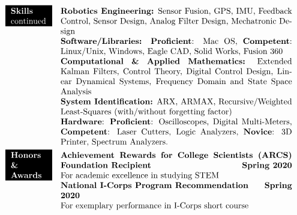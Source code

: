 \documentclass[paper=a4,fontsize=11pt]{article} %
\def \mainColWidth {0.8\textwidth}		%
\def \leftColWidth {0.125\textwidth}		%
\begin{document}
\begin{align*}
{%
	}%
\\
	\colorbox{black}{\color{white}{
			\parbox[t]{\leftColWidth}{%
				\textbf{Skills} continued}
		}%
	}
	& & 
	\parbox[t]{\mainColWidth}{%
		\textbf{Robotics Engineering:} Sensor Fusion, GPS, IMU, Feedback Control, Sensor Design, Analog Filter Design, Mechatronic Design\\
		\textbf{Software/Libraries:} \textbf{Proficient}: Mac OS, \textbf{Competent}: Linux/Unix, Windows, Eagle CAD, Solid Works, Fusion 360\\
		\textbf{Computational \& Applied Mathematics:} Extended Kalman Filters, Control Theory, Digital Control Design, Linear Dynamical Systems, Frequency Domain and State Space Analysis\\
		\textbf{System Identification:} ARX, ARMAX, Recursive/Weighted Least-Squares (with/without forgetting factor)\\
		\textbf{Hardware}: \textbf{Proficient}: Oscilloscopes, Digital Multi-Meters, \textbf{Competent}: Laser Cutters, Logic Analyzers, \textbf{Novice}: 3D Printer, Spectrum Analyzers.
}%
\\
\colorbox{black}{\color{white}{
		\parbox[t]{\leftColWidth}{%
			\textbf{Honors \& Awards}}
	}%
}
& &
\parbox[t]{\mainColWidth}{%
	\textbf{Achievement Rewards for College Scientists (ARCS) Foundation Recipient}  \hfill \textbf{Spring 2020}\\
	\quad For academic excellence in studying STEM\\
	\textbf{National I-Corps Program Recommendation}  \hfill \textbf{Spring 2020}\\
	\quad For exemplary performance in I-Corps short course
}
\end{align*}
\end{document}
